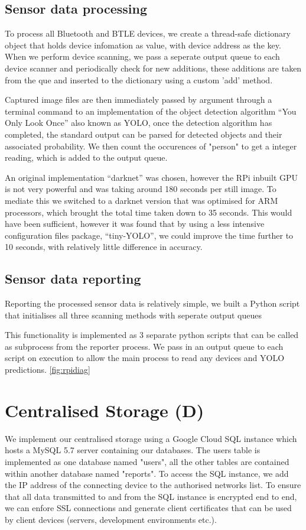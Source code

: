 \documentclass{l4proj}
\begin{document}
\subsection{Sensor data processing}
To process all Bluetooth and BTLE devices, we create a thread-safe dictionary object that holds device infomation as value, with device address as the key. When we perform device scanning, we pass a seperate output queue to each device scanner and periodically check for new additions, these additions are taken from the que and inserted to the dictionary using a custom 'add' method.

Captured image files are then immediately passed by argument through a terminal command to an implementation of the object detection algorithm “You Only Look Once” also known as YOLO, once the detection algorithm has completed, the standard output can be parsed for detected objects and their associated probability. We then count the occurences of "person" to get a integer reading, which is added to the output queue.

An original implementation “darknet” was chosen, however the RPi inbuilt GPU is not very powerful and was taking around 180 seconds per still image. To mediate this we switched to a darknet version that was optimised for ARM processors, which brought the total time taken down to 35 seconds. This would have been sufficient, however it was found that by using a less intensive configuration files package,  “tiny-YOLO”, we could improve the time further to 10 seconds, with relatively little difference in accuracy.

\subsection{Sensor data reporting}

Reporting the processed sensor data is relatively simple, we built a Python script that initialises all three scanning methods with seperate output queues



This functionality is implemented as 3 separate python scripts that can be called as subprocess from the reporter process. We pass in an output queue to each script on execution to allow the main process to read any devices and YOLO predictions. \ref{fig:rpidiag}



\section{Centralised Storage (D)}
We implement our centralised storage using a Google Cloud SQL instance which hosts a MySQL 5.7 server containing our databases. The users table is implemented as one database named "users", all the other tables are contained within another database named "reports". To access the SQL instance, we add the IP address of the connecting device to the authorised networks list. To ensure that all data transmitted to and from the SQL instance is encrypted end to end, we can enfore SSL connections and generate client certificates that can be used by client devices (servers, development environments etc.).
\end{document}
